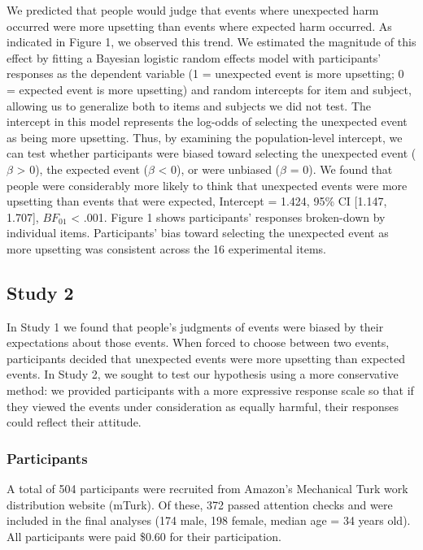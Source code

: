 \documentclass[9pt,twocolumn,twoside,]{pnas-new}
\begin{document}
{We predicted that people would judge that events where unexpected harm
occurred were more upsetting than events where expected harm occurred.
As indicated in Figure 1, we observed this trend. We estimated the
magnitude of this effect by fitting a Bayesian logistic random effects
model with participants' responses as the dependent variable (1 =
unexpected event is more upsetting; 0 = expected event is more
upsetting) and random intercepts for item and subject, allowing us to
generalize both to items and subjects we did not test. The intercept in
this model represents the log-odds of selecting the unexpected event as
being more upsetting. Thus, by examining the population-level intercept,
we can test whether participants were biased toward selecting the
unexpected event (\(\beta\) \textgreater{} 0), the expected event
(\(\beta\) \textless{} 0), or were unbiased (\(\beta\) = 0). We found
that people were considerably more likely to think that unexpected
events were more upsetting than events that were expected, Intercept =
1.424, 95\% CI {[}1.147, 1.707{]}, \(BF_{01}\) \textless{} .001. Figure
1 shows participants' responses broken-down by individual items.
Participants' bias toward selecting the unexpected event as more
upsetting was consistent across the 16 experimental items.

\subsection*{Study 2}\label{study2}

In Study 1 we found that people's judgments of events were biased by
their expectations about those events. When forced to choose between two
events, participants decided that unexpected events were more upsetting
than expected events. In Study 2, we sought to test our hypothesis using
a more conservative method: we provided participants with a more
expressive response scale so that if they viewed the events under
consideration as equally harmful, their responses could reflect their
attitude.

\subsubsection*{Participants}\label{s2-participants}

A total of 504 participants were recruited from Amazon's Mechanical Turk
work distribution website (mTurk). Of these, 372 passed attention checks
and were included in the final analyses (174 male, 198 female, median
age = 34 years old). All participants were paid \$0.60 for their
participation.

}
\end{document}
